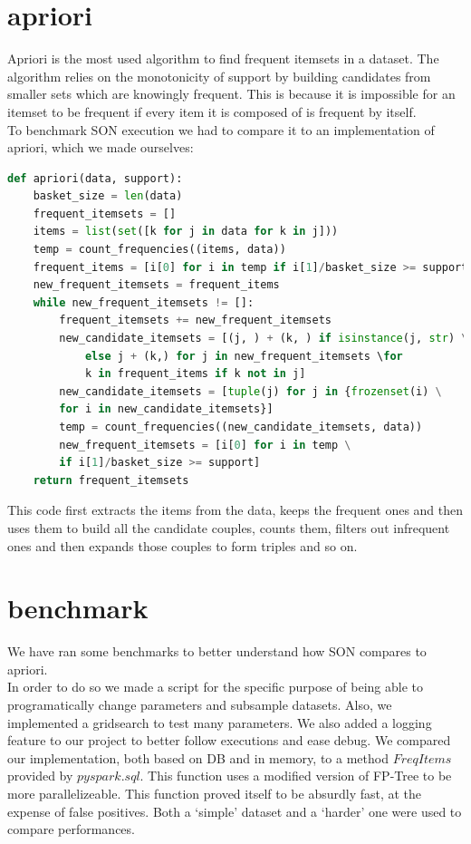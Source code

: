 \documentclass[a4paper]{article}
\begin{document}
	\newpage
	
	\section{apriori}
	\label{section:apriori}
	
	Apriori is the most used algorithm to find frequent itemsets in a dataset. The algorithm relies on the monotonicity of support by building candidates from smaller sets which are knowingly frequent. This is because it is impossible for an itemset to be frequent if every item it is composed of is frequent by itself.\\
	
	To benchmark SON execution we had to compare it to an implementation of apriori, which we made ourselves:
	\begin{lstlisting}[language=Python]
def apriori(data, support):
    basket_size = len(data)
    frequent_itemsets = []
    items = list(set([k for j in data for k in j]))
    temp = count_frequencies((items, data))
    frequent_items = [i[0] for i in temp if i[1]/basket_size >= support]
    new_frequent_itemsets = frequent_items
    while new_frequent_itemsets != []:
        frequent_itemsets += new_frequent_itemsets
        new_candidate_itemsets = [(j, ) + (k, ) if isinstance(j, str) \
        	else j + (k,) for j in new_frequent_itemsets \for
        	k in frequent_items if k not in j]
        new_candidate_itemsets = [tuple(j) for j in {frozenset(i) \
        for i in new_candidate_itemsets}]
        temp = count_frequencies((new_candidate_itemsets, data))
        new_frequent_itemsets = [i[0] for i in temp \
        if i[1]/basket_size >= support]
    return frequent_itemsets	
    \end{lstlisting}
    This code first extracts the items from the data, keeps the frequent ones and then uses them to build all the candidate couples, counts them, filters out infrequent ones and then expands those couples to form triples and so on.
	
	\section{benchmark}
	We have ran some benchmarks to better understand how SON compares to apriori.\\
	In order to do so we made a script for the specific purpose of being able to programatically change parameters and 
	subsample datasets.
	Also, we implemented a gridsearch to test many parameters. We also added a logging feature to our project to better follow executions and ease debug.
	We compared our implementation, both based on DB and in memory, to a method $FreqItems$ provided by $pyspark.sql$. 
	This function uses a modified version of FP-Tree to be more parallelizeable. This function proved itself to be absurdly fast, at the expense of false positives.
	Both a  `simple' dataset and a `harder' one were used to compare performances.
\end{document}
